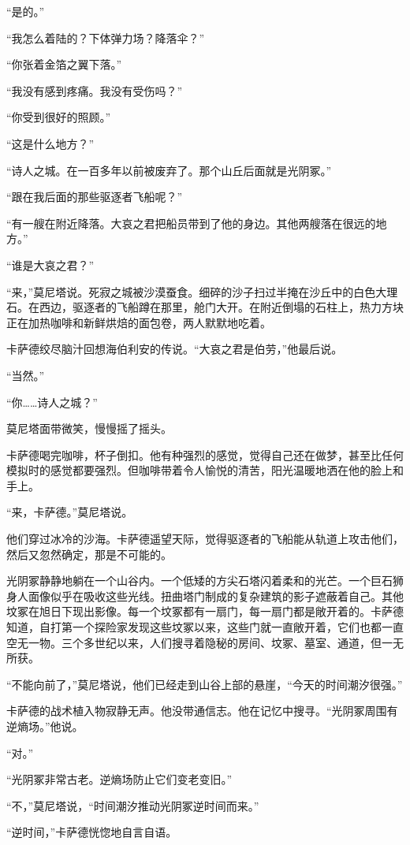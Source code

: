 \documentclass[AutoFakeBold=true]{book}
\begin{document}
``是的。''

``我怎么着陆的？下体弹力场？降落伞？''

``你张着金箔之翼下落。''

``我没有感到疼痛。我没有受伤吗？''

``你受到很好的照顾。''

``这是什么地方？''

``诗人之城。在一百多年以前被废弃了。那个山丘后面就是光阴冢。''

``跟在我后面的那些驱逐者飞船呢？''

``有一艘在附近降落。大哀之君把船员带到了他的身边。其他两艘落在很远的地方。''

``谁是大哀之君？''

``来，''莫尼塔说。死寂之城被沙漠蚕食。细碎的沙子扫过半掩在沙丘中的白色大理石。在西边，驱逐者的飞船蹲在那里，舱门大开。在附近倒塌的石柱上，热力方块正在加热咖啡和新鲜烘焙的面包卷，两人默默地吃着。

卡萨德绞尽脑汁回想海伯利安的传说。``大哀之君是伯劳，''他最后说。

``当然。''

``你……诗人之城？''

莫尼塔面带微笑，慢慢摇了摇头。

卡萨德喝完咖啡，杯子倒扣。他有种强烈的感觉，觉得自己还在做梦，甚至比任何模拟时的感觉都要强烈。但咖啡带着令人愉悦的清苦，阳光温暖地洒在他的脸上和手上。

``来，卡萨德。''莫尼塔说。

他们穿过冰冷的沙海。卡萨德遥望天际，觉得驱逐者的飞船能从轨道上攻击他们，然后又忽然确定，那是不可能的。

光阴冢静静地躺在一个山谷内。一个低矮的方尖石塔闪着柔和的光芒。一个巨石狮身人面像似乎在吸收这些光线。扭曲塔门制成的复杂建筑的影子遮蔽着自己。其他坟冢在旭日下现出影像。每一个坟冢都有一扇门，每一扇门都是敞开着的。卡萨德知道，自打第一个探险家发现这些坟冢以来，这些门就一直敞开着，它们也都一直空无一物。三个多世纪以来，人们搜寻着隐秘的房间、坟冢、墓室、通道，但一无所获。

``不能向前了，''莫尼塔说，他们已经走到山谷上部的悬崖，``今天的时间潮汐很强。''

卡萨德的战术植入物寂静无声。他没带通信志。他在记忆中搜寻。``光阴冢周围有逆熵场。''他说。

``对。''

``光阴冢非常古老。逆熵场防止它们变老变旧。''

``不，''莫尼塔说，``时间潮汐推动光阴冢逆时间而来。''

``逆时间，''卡萨德恍惚地自言自语。
\end{document}
